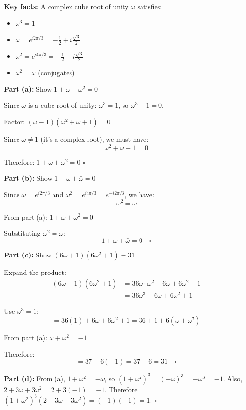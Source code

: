 \begin{solution}[Sketch]
\textbf{Key facts:} A complex cube root of unity $\omega$ satisfies:
\begin{itemize}[leftmargin=*]
  \item $\omega^3 = 1$
  \item $\omega = e^{i2\pi/3} = -\frac{1}{2} + i\frac{\sqrt{3}}{2}$
  \item $\omega^2 = e^{i4\pi/3} = -\frac{1}{2} - i\frac{\sqrt{3}}{2}$
  \item $\omega^2 = \bar{\omega}$ (conjugates)
\end{itemize}

\textbf{Part (a):} Show $1 + \omega + \omega^2 = 0$

Since $\omega$ is a cube root of unity: $\omega^3 = 1$, so $\omega^3 - 1 = 0$.

Factor: $(\omega - 1)(\omega^2 + \omega + 1) = 0$

Since $\omega \neq 1$ (it's a complex root), we must have:
\[
\omega^2 + \omega + 1 = 0
\]

Therefore: $1 + \omega + \omega^2 = 0$ \quad $\square$

\textbf{Part (b):} Show $1 + \omega + \bar{\omega} = 0$

Since $\omega = e^{i2\pi/3}$ and $\omega^2 = e^{i4\pi/3} = e^{-i2\pi/3}$, we have:
\[
\omega^2 = \overline{\omega}
\]

From part (a): $1 + \omega + \omega^2 = 0$

Substituting $\omega^2 = \bar{\omega}$:
\[
1 + \omega + \bar{\omega} = 0 \quad \square
\]

\textbf{Part (c):} Show $(6\omega + 1)(6\omega^2 + 1) = 31$

Expand the product:
\begin{align*}
(6\omega + 1)(6\omega^2 + 1) &= 36\omega \cdot \omega^2 + 6\omega + 6\omega^2 + 1\\
&= 36\omega^3 + 6\omega + 6\omega^2 + 1
\end{align*}

Use $\omega^3 = 1$:
\[
= 36(1) + 6\omega + 6\omega^2 + 1 = 36 + 1 + 6(\omega + \omega^2)
\]

From part (a): $\omega + \omega^2 = -1$

Therefore:
\[
= 37 + 6(-1) = 37 - 6 = 31 \quad \square
\]

\textbf{Part (d):} From (a), $1+\omega^2=-\omega$, so $(1+\omega^2)^3=(-\omega)^3=-\omega^3=-1$. Also, $2+3\omega+3\omega^2=2+3(-1)=-1$. Therefore $(1+\omega^2)^3(2+3\omega+3\omega^2)=(-1)(-1)=1$. \quad $\square$
\end{solution}


